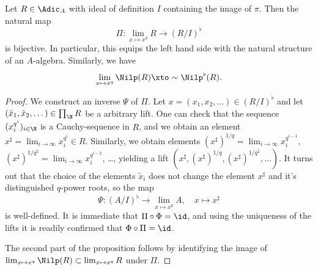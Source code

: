 \documentclass[../main.tex]{subfiles}
\begin{document}
\begin{prop}\label{prop:Teichmuellerlift}
    Let $R \in \Adic_A$ with ideal of definition $I$ containing the image of $\pi$. Then
    the natural map
    \begin{equation*}
        \Pi: \lim_{x \mapsto x^q} R \to (R/I)^\flat 
    \end{equation*}
    is bijective. In particular, this equips the left hand side with the natural
    structure of an $A$-algebra. Similarly, we have
    \begin{equation*}
        \lim_{x \mapsto x^q} \Nilp(R) \xto \sim \Nilp^\flat(R).
    \end{equation*}
\begin{proof}
    We construct an inverse $\Psi$ of $\Pi$. Let $x = (x_1, x_2, \dots) \in (R/I)^\flat$ 
    and let $(\tilde x_1, \tilde x_2, \dots) \in \prod_\N R$ be a arbitrary
    lift. One can check that the sequence $(x_i^{q^i})_{i \in \N}$ is a
    Cauchy-sequence in $R$, and we obtain an element $x^\sharp = \lim_{i \to
    \infty} x_i^{q^i} \in R$. Similarly, we obtain elements $(x^\sharp)^{1/q} =
    \lim_{i \to \infty} x_i^{q^{i-1}}$, $(x^\sharp)^{1/q^2} = \lim_{i \to
    \infty} x_i^{q^{i-2}}$, \dots, yielding a lift $(x^\sharp,
    (x^\sharp)^{1/q}, (x^\sharp)^{1/q^2}, \dots)$. It turns out that the choice of the 
    elements $\tilde x_i$ does not change the element $x^\sharp$ and it's distinguished
    $q$-power roots, so the map 
    $$\Psi: (A/I)^\flat \to \lim_{x \mapsto x^q} A , \quad x \mapsto x^\sharp$$
    is well-defined. 
    It is immediate that $\Pi \circ \Phi = \id$, and using the uniqueness of the
    lifts it is readily confirmed that $\Phi \circ \Pi = \id$. 

    The second part of the proposition follows by identifying the image of 
    $\lim_{x\mapsto x^q} \Nilp(R) \subset \lim_{x \mapsto x^q} R$ under 
    $\Pi$. 
\end{proof}
\end{prop}
\end{document}
